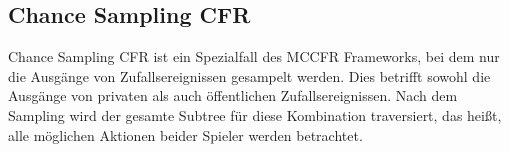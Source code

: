 \subsection{Chance Sampling CFR}

Chance Sampling CFR ist ein Spezialfall des MCCFR Frameworks, bei dem nur die Ausgänge von Zufallsereignissen gesampelt werden.
Dies betrifft sowohl die Ausgänge von privaten als auch öffentlichen Zufallsereignissen.
Nach dem Sampling wird der gesamte Subtree für diese Kombination traversiert, das heißt, alle möglichen Aktionen beider Spieler werden betrachtet.

